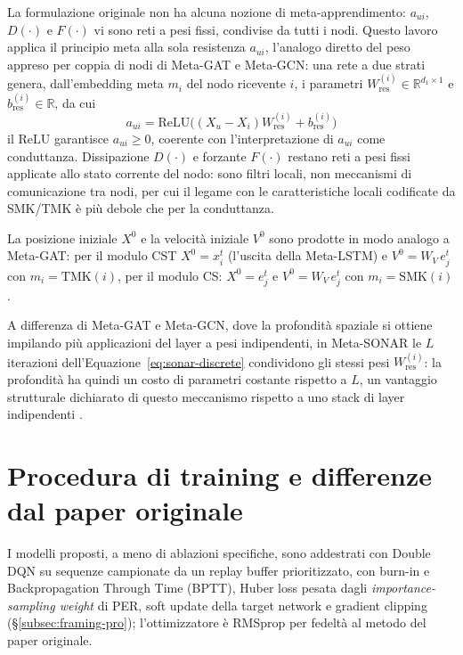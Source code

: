 La formulazione originale non ha alcuna nozione di meta-apprendimento:
$a_{ui}$, $D(\cdot)$ e $F(\cdot)$ vi sono reti a pesi fissi, condivise da
tutti i nodi. Questo lavoro applica il principio meta alla sola resistenza
$a_{ui}$, l'analogo diretto del peso appreso per coppia di nodi di Meta-GAT
e Meta-GCN: una rete a due strati genera, dall'embedding meta $m_i$ del nodo
ricevente $i$, i parametri $W_{\mathrm{res}}^{(i)} \in \mathbb{R}^{d_1
    \times 1}$ e $b_{\mathrm{res}}^{(i)} \in \mathbb{R}$, da cui
\begin{equation}
  a_{ui} = \mathrm{ReLU}\Big((X_u - X_i)W_{\mathrm{res}}^{(i)} + b_{\mathrm{res}}^{(i)}\Big)
  \label{eq:sonar-resistance}
\end{equation}
il $\mathrm{ReLU}$ garantisce $a_{ui} \geq 0$, coerente con l'interpretazione
di $a_{ui}$ come conduttanza. Dissipazione $D(\cdot)$ e forzante $F(\cdot)$
restano reti a pesi fissi applicate allo stato corrente del nodo: sono
filtri locali, non meccanismi di comunicazione tra nodi, per cui il legame
con le caratteristiche locali codificate da SMK/TMK è più debole che per la
conduttanza.

La posizione iniziale $X^0$ e la velocità iniziale $V^0$ sono prodotte in modo analogo a Meta-GAT:
per il modulo CST $X^0=x_i^t$ (l'uscita della Meta-LSTM) e $V^0=W_V\,e_j^t$ con $m_i=\mathrm{TMK}(i)$,
per il modulo CS: $X^0=e_j^t$ e $V^0=W_V\,e_j^t$ con $m_i=\mathrm{SMK}(i)$.

A differenza di Meta-GAT e Meta-GCN, dove la profondità spaziale si ottiene
impilando più applicazioni del layer a pesi indipendenti, in Meta-SONAR le
$L$ iterazioni dell'Equazione~\ref{eq:sonar-discrete} condividono gli stessi
pesi $W_{\mathrm{res}}^{(i)}$: la profondità ha quindi un costo di parametri
costante rispetto a $L$, un vantaggio strutturale dichiarato di questo
meccanismo rispetto a uno stack di layer indipendenti
\citep{trenta2025sonar}.

\section{Procedura di training e differenze dal paper originale}
\label{sec:training}

I modelli proposti, a meno di ablazioni specifiche, sono addestrati con Double DQN su sequenze campionate da un replay
buffer prioritizzato, con burn-in e Backpropagation Through Time (BPTT), Huber loss pesata dagli
\emph{importance-sampling weight} di PER, soft update della target network e
gradient clipping (§\ref{subsec:framing-pro}); l'ottimizzatore è RMSprop
per fedeltà al metodo del paper originale.

